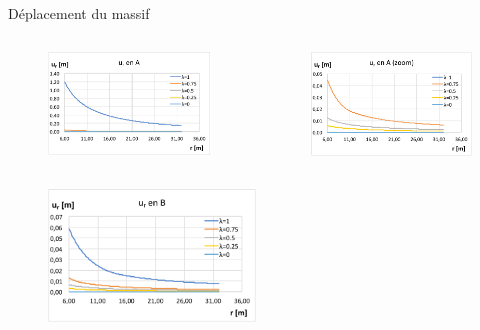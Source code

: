 \documentclass{beamer}
\begin{document}
\begin{frame}{Déplacement du massif}
    
    \begin{columns}
    \begin{column}{0.5\textwidth}
\begin{figure}
\centering
\includegraphics[width=5.5cm]{ur_A2.pdf}
\end{figure}
    \end{column}
    
    \begin{column}{0.5\textwidth}
\begin{figure}
\centering
\includegraphics[width=5.5cm]{ur_A_zoom.pdf}
\end{figure}
    \end{column}
    \end{columns}
    
    \begin{figure}
\centering
\includegraphics[width=5.5cm]{ur_B2.pdf}
\end{figure}

\end{frame}
\end{document}
